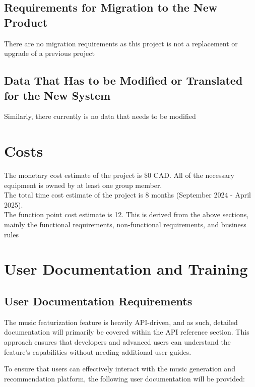 \documentclass[12pt]{article}
\begin{document}
\subsection{Requirements for Migration to the New Product}
There are no migration requirements as this project is not a replacement or upgrade of a previous project
\subsection{Data That Has to be Modified or Translated for the New System}
Similarly, there currently is no data that needs to be modified

\section{Costs}
The monetary cost estimate of the project is \$0 CAD. All of the necessary equipment is
owned by at least one group member.\\

\noindent
The total time cost estimate of the project is 8 months (September 2024 - April 2025).\\

\noindent
The function point cost estimate is 12. This is derived from the above sections, mainly the functional
requirements, non-functional requirements, and business rules
\section{User Documentation and Training}

\subsection{User Documentation Requirements}

The music featurization feature is heavily API-driven, and as such, detailed documentation will primarily be covered within the API reference section. This approach ensures that developers and advanced users can understand the feature's capabilities without needing additional user guides.

To ensure that users can effectively interact with the music generation and recommendation platform, the following user documentation will be provided:
\end{document}
